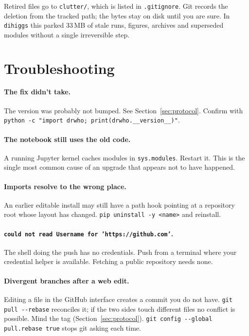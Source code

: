 \documentclass[11pt,a4paper]{article}
\newcommand{\pkg}[1]{\texttt{#1}}
\begin{document}
\begin{rulebox}
Retired files go to \texttt{clutter/}, which is listed in \texttt{.gitignore}.
Git records the deletion from the tracked path; the bytes stay on disk until you
are sure. In \pkg{dihiggs} this parked 33\,MB of stale runs, figures, archives
and superseded modules without a single irreversible step.
\end{rulebox}

\section{Troubleshooting}

\paragraph{The fix didn't take.}
The version was probably not bumped. See Section~\ref{sec:protocol}. Confirm with
\texttt{python -c "import drwho; print(drwho.\_\_version\_\_)"}.

\paragraph{The notebook still uses the old code.}
A running Jupyter kernel caches modules in \texttt{sys.modules}. Restart it. This
is the single most common cause of an upgrade that appears not to have happened.

\paragraph{Imports resolve to the wrong place.}
An earlier editable install may still have a path hook pointing at a repository
root whose layout has changed. \texttt{pip uninstall -y <name>} and reinstall.

\paragraph{\texttt{could not read Username for 'https://github.com'}.}
The shell doing the push has no credentials. Push from a terminal where your
credential helper is available. Fetching a public repository needs none.

\paragraph{Divergent branches after a web edit.}
Editing a file in the GitHub interface creates a commit you do not have.
\texttt{git pull -{}-rebase} reconciles it; if the two sides touch different
files no conflict is possible. Mind the tag (Section~\ref{sec:protocol}).
\texttt{git config -{}-global pull.rebase true} stops git asking each time.
\end{document}
